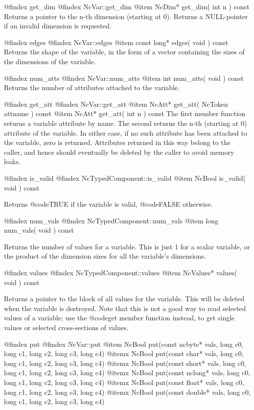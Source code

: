 @findex get_dim
@findex NcVar::get_dim
@item NcDim* get_dim( int n ) const
Returns a pointer to the n-th dimension (starting at 0).  Returns a
NULL-pointer if an invalid dimension is requested.

@findex edges
@findex NcVar::edges
@item const long* edges( void ) const
Returns the shape of the variable, in the form of a vector containing
the sizes of the dimensions of the variable.

@findex num_atts
@findex NcVar::num_atts
@item int num_atts( void ) const
Returns the number of attributes attached to the variable.

@findex get_att
@findex NcVar::get_att
@item NcAtt* get_att( NcToken attname ) const
@item NcAtt* get_att( int n ) const
The first member function returns a variable attribute by name.  The
second returns the n-th (starting at 0) attribute of the variable.  In
either case, if no such attribute has been attached to the variable,
zero is returned.  Attributes returned in this way belong to the caller,
and hence should eventually be deleted by the caller to avoid memory
leaks.

@findex is_valid
@findex NcTypedComponent::is_valid
@item NcBool is_valid( void ) const

Returns @code{TRUE} if the variable is valid, @code{FALSE} otherwise.

@findex num_vals
@findex NcTypedComponent::num_vals
@item long num_vals( void ) const

Returns the number of values for a variable.  This is just 1 for a
scalar variable, or the product of the dimension sizes for all the
variable's dimensions.

@findex values
@findex NcTypedComponent::values
@item NcValues* values( void ) const

Returns a pointer to the block of all values for the variable.  
This will be deleted when the variable is
destroyed.  Note that this is not a good way to read selected values of
a variable; use the @code{get} member function instead, to get single
values or selected cross-sections of values.

@findex put
@findex NcVar::put
@item  NcBool put(const ncbyte* vals, long c0, long c1, long c2, long c3, long c4)
@itemx NcBool put(const char*   vals, long c0, long c1, long c2, long c3, long c4)
@itemx NcBool put(const short*  vals, long c0, long c1, long c2, long c3, long c4)
@itemx NcBool put(const nclong* vals, long c0, long c1, long c2, long c3, long c4)
@itemx NcBool put(const float*  vals, long c0, long c1, long c2, long c3, long c4)
@itemx NcBool put(const double* vals, long c0, long c1, long c2, long c3, long c4)

